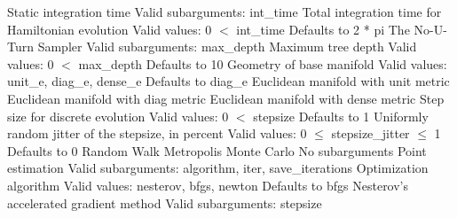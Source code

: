 \begin{description}
%
            {Static integration time}
            {Valid subarguments: int\_time}
%
              {Total integration time for Hamiltonian evolution}
              {Valid values: 0 $<$ int\_time}
              {Defaults to 2 * pi}
%
            {The No-U-Turn Sampler}
            {Valid subarguments: max\_depth}
%
              {Maximum tree depth}
              {Valid values: 0 $<$ max\_depth}
              {Defaults to 10}
%
          {Geometry of base manifold}
          {Valid values: unit\_e, diag\_e, dense\_e}
          {Defaults to diag\_e}
%
            {Euclidean manifold with unit metric}
%
            {Euclidean manifold with diag metric}
%
            {Euclidean manifold with dense metric}
%
          {Step size for discrete evolution}
          {Valid values: 0 $<$ stepsize}
          {Defaults to 1}
%
          {Uniformly random jitter of the stepsize, in percent}
          {Valid values: 0 $\le$ stepsize\_jitter $\le$ 1}
          {Defaults to 0}
%
        {Random Walk Metropolis Monte Carlo}
        {No subarguments}
%
    {Point estimation}
    {Valid subarguments: algorithm, iter, save\_iterations}
%
      {Optimization algorithm}
      {Valid values: nesterov, bfgs, newton}
      {Defaults to bfgs}
%
        {Nesterov's accelerated gradient method}
        {Valid subarguments: stepsize}
%

\end{description}
